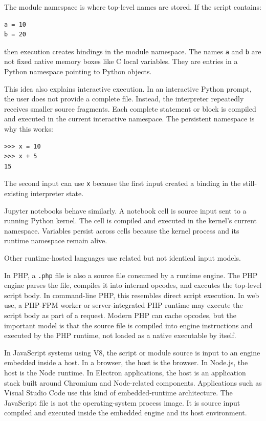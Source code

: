 \documentclass[a4paper,twoside]{report}
\begin{document}
The module namespace is where top-level names are stored. If the script contains:

\begin{verbatim}
a = 10
b = 20
\end{verbatim}

then execution creates bindings in the module namespace. The names \texttt{a} and \texttt{b} are not fixed native memory boxes like C local variables. They are entries in a Python namespace pointing to Python objects.

This idea also explains interactive execution. In an interactive Python prompt, the user does not provide a complete file. Instead, the interpreter repeatedly receives smaller source fragments. Each complete statement or block is compiled and executed in the current interactive namespace. The persistent namespace is why this works:

\begin{verbatim}
>>> x = 10
>>> x + 5
15
\end{verbatim}

The second input can use \texttt{x} because the first input created a binding in the still-existing interpreter state.

Jupyter notebooks behave similarly. A notebook cell is source input sent to a running Python kernel. The cell is compiled and executed in the kernel's current namespace. Variables persist across cells because the kernel process and its runtime namespace remain alive.

Other runtime-hosted languages use related but not identical input models.

In PHP, a \texttt{.php} file is also a source file consumed by a runtime engine. The PHP engine parses the file, compiles it into internal opcodes, and executes the top-level script body. In command-line PHP, this resembles direct script execution. In web use, a PHP-FPM worker or server-integrated PHP runtime may execute the script body as part of a request. Modern PHP can cache opcodes, but the important model is that the source file is compiled into engine instructions and executed by the PHP runtime, not loaded as a native executable by itself.

In JavaScript systems using V8, the script or module source is input to an engine embedded inside a host. In a browser, the host is the browser. In Node.js, the host is the Node runtime. In Electron applications, the host is an application stack built around Chromium and Node-related components. Applications such as Visual Studio Code use this kind of embedded-runtime architecture. The JavaScript file is not the operating-system process image. It is source input compiled and executed inside the embedded engine and its host environment.
\end{document}
